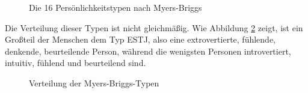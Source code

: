 \begin{figure}[htbp!]
	\centering
	\caption[Myers-Briggs-Typenindikator]{Die 16 Persönlichkeitstypen nach Myers-Briggs}
	\label{img:mbti}
\end{figure}

Die Verteilung dieser Typen ist nicht gleichmäßig. Wie Abbildung \ref{img:mbti_distribution} zeigt, ist ein Großteil der Menschen dem Typ ESTJ, also eine extrovertierte, fühlende, denkende, beurteilende Person, während die wenigsten Personen introvertiert, intuitiv, fühlend und beurteilend sind.    

\begin{figure}[H]
	\centering
	\caption[Verteilung der Myers-Briggs-Typen]{Verteilung der Myers-Briggs-Typen \cite{myers_myers_2002}}
	\label{img:mbti_distribution}
\end{figure}

